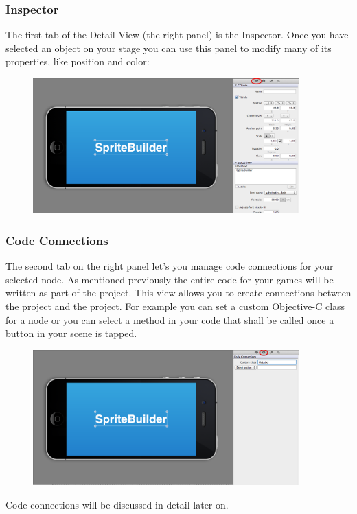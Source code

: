 \subsubsection{Inspector}
The first tab of the Detail View (the right panel) is
the Inspector. Once you have selected an object on your stage you can use this panel to modify many of its properties, like position and color:
\begin{figure}[H]
		\centering
		\includegraphics[width=290pt]{images/spritebuilder/spritebuilder_inspector.png}     
\end{figure} 

\subsubsection{Code Connections}
The second tab on the right panel let's you manage code connections for your
selected node. As mentioned previously the entire code for your games will be
written as part of the \xcode{} project. This view allows you to create
connections between the \xcode{} project and the \SB{} project. For example you can set a custom Objective-C class for a node or you can select
a method in your code that shall be called once a button in your scene is tapped. 

\begin{figure}[H]
		\centering
		\includegraphics[width=290pt]{images/spritebuilder/spritebuilder_codeconnections.png}     
\end{figure} 
Code connections will be discussed in detail later on.

